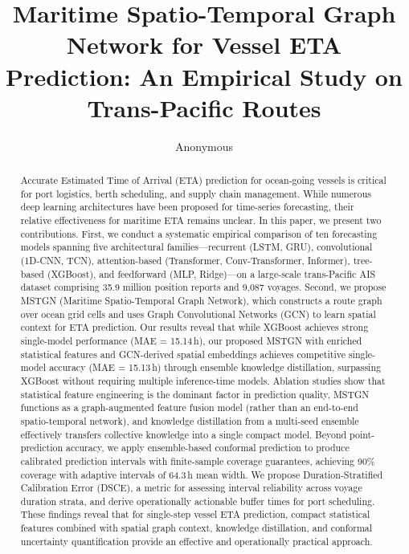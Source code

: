 \documentclass[sigconf,anonymous]{acmart}%
\begin{document}
\title{Maritime Spatio-Temporal Graph Network for Vessel ETA Prediction: An Empirical Study on Trans-Pacific Routes}

\author{Anonymous}

\renewcommand{\shortauthors}{Anonymous}

\begin{abstract}
Accurate Estimated Time of Arrival (ETA) prediction for ocean-going vessels is critical for port logistics, berth scheduling, and supply chain management.
While numerous deep learning architectures have been proposed for time-series forecasting, their relative effectiveness for maritime ETA remains unclear.
In this paper, we present two contributions.
First, we conduct a systematic empirical comparison of ten forecasting models spanning five architectural families---recurrent (LSTM, GRU), convolutional (1D-CNN, TCN), attention-based (Transformer, Conv-Transformer, Informer), tree-based (XGBoost), and feedforward (MLP, Ridge)---on a large-scale trans-Pacific AIS dataset comprising 35.9 million position reports and 9,087 voyages.
Second, we propose MSTGN (Maritime Spatio-Temporal Graph Network), which constructs a route graph over ocean grid cells and uses Graph Convolutional Networks (GCN) to learn spatial context for ETA prediction.
Our results reveal that while XGBoost achieves strong single-model performance (MAE = 15.14\,h), our proposed MSTGN with enriched statistical features and GCN-derived spatial embeddings achieves competitive single-model accuracy (MAE = 15.13\,h) through ensemble knowledge distillation, surpassing XGBoost without requiring multiple inference-time models.
Ablation studies show that statistical feature engineering is the dominant factor in prediction quality, MSTGN functions as a graph-augmented feature fusion model (rather than an end-to-end spatio-temporal network), and knowledge distillation from a multi-seed ensemble effectively transfers collective knowledge into a single compact model.
Beyond point-prediction accuracy, we apply ensemble-based conformal prediction to produce calibrated prediction intervals with finite-sample coverage guarantees, achieving 90\% coverage with adaptive intervals of 64.3\,h mean width.
We propose Duration-Stratified Calibration Error (DSCE), a metric for assessing interval reliability across voyage duration strata, and derive operationally actionable buffer times for port scheduling.
These findings reveal that for single-step vessel ETA prediction, compact statistical features combined with spatial graph context, knowledge distillation, and conformal uncertainty quantification provide an effective and operationally practical approach.
\end{abstract}
\end{document}

